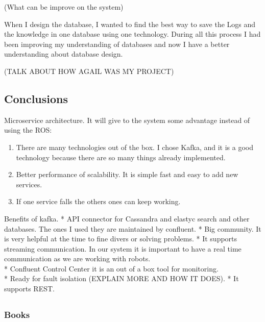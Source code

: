 \documentclass[]{article}
\providecommand{\tightlist}{%
  \setlength{\itemsep}{0pt}\setlength{\parskip}{0pt}}
\begin{document}
(What can be improve on the system)

When I design the database, I wanted to find the best way to save the
Logs and the knowledge in one database using one technology. During all
this process I had been improving my understanding of databases and now
I have a better understanding about database design.

(TALK ABOUT HOW AGAIL WAS MY PROJECT)

\hypertarget{conclusions}{%
\subsection{Conclusions}\label{conclusions}}

Microservice architecture. It will give to the system some advantage
instead of using the ROS:

\begin{enumerate}
\def\labelenumi{\arabic{enumi}.}
\tightlist
\item
  There are many technologies out of the box. I chose Kafka, and it is a
  good technology because there are so many things already implemented.
\item
  Better performance of scalability. It is simple fast and easy to add
  new services.
\item
  If one service falls the others ones can keep working.
\end{enumerate}

Benefits of kafka. * API connector for Cassandra and elastyc search and
other databases. The ones I used they are maintained by confluent. * Big
community. It is very helpful at the time to fine divers or solving
problems. * It supports streaming communication. In our system it is
important to have a real time communication as we are working with
robots.\\
* Confluent Control Center it is an out of a box tool for monitoring.\\
* Ready for fault isolation (EXPLAIN MORE AND HOW IT DOES). * It
supports REST.

\hypertarget{section}{%
\subsection{}\label{section}}

\hypertarget{books}{%
\subsubsection{Books}\label{books}}
\end{document}
